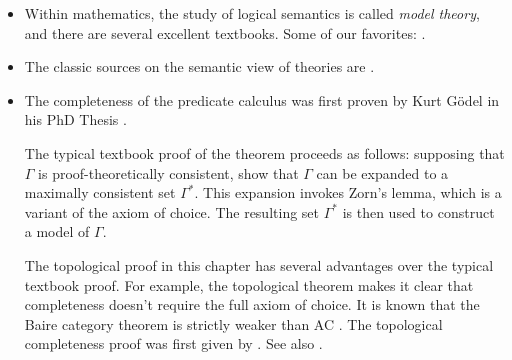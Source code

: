 \begin{itemize}

\item Within mathematics, the study of logical semantics is called
  \emph{model theory}, and there are several excellent textbooks.
  Some of our favorites: \cite{hodges,marker,poizat}.
\item The classic sources on the semantic view of theories are
  \cite{suppe1977,suppe1989}.
\item The completeness of the predicate calculus was first proven by
  Kurt G{\"o}del in his PhD Thesis \citep{goedel}.

  The typical textbook proof of the theorem proceeds as follows:
  supposing that $\Gamma$ is proof-theoretically consistent, show that
  $\Gamma$ can be expanded to a maximally consistent set $\Gamma ^*$.
  This expansion invokes Zorn's lemma, which is a variant of the axiom
  of choice.  The resulting set $\Gamma ^*$ is then used to construct
  a model of $\Gamma$.

  The topological proof in this chapter has several advantages over
  the typical textbook proof.  For example, the topological theorem
  makes it clear that completeness doesn't require the full axiom of
  choice.  It is known that the Baire category theorem is strictly
  weaker than AC \citep[see][]{herrlich2000,herrlich2006}.  The
  topological completeness proof was first given by
  \cite{rasiowa}. See also \citep{rasiowa-book}.


\end{itemize}
